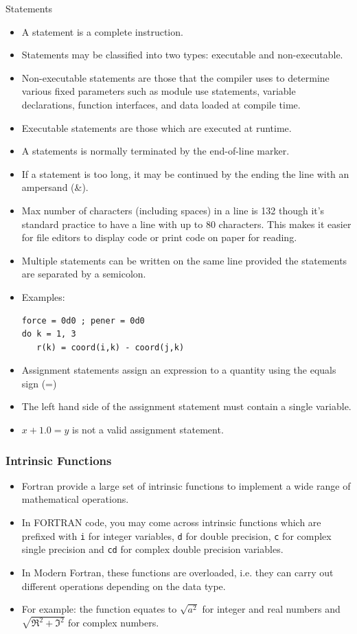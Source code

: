 \documentclass[10pt,t]{beamer}
\begin{document}
\begin{frame}{Statements}
  \begin{itemize}
    \item A statement is a complete instruction.
    \item Statements may be classified into two types: executable and non-executable.
    \item Non-executable statements are those that the compiler uses to determine various fixed parameters such as module use statements, variable declarations, function interfaces, and data loaded at compile time.
    \item Executable statements are those which are executed at runtime.
    \item A statements is normally terminated by the end-of-line marker.
    \item If a statement is too long, it may be continued by the ending the line with an ampersand (\&).
    \item Max number of characters (including spaces) in a line is 132 though it's standard practice to have a line with up to 80 characters. This makes it easier for file editors to display code or print code on paper for reading.
    \item Multiple statements can be written on the same line provided the statements are separated by a semicolon.
    \item Examples:
      \begin{lstlisting}[language={[90]Fortran}]
force = 0d0 ; pener = 0d0
do k = 1, 3
   r(k) = coord(i,k) - coord(j,k)
      \end{lstlisting}
    \item Assignment statements assign an expression to a quantity using the equals sign (=)
    \item The left hand side of the assignment statement must contain a single variable.
    \item $x + 1.0 = y$ is not a valid assignment statement.
  \end{itemize}
\end{frame}

\begin{frame}
  \frametitle{Intrinsic Functions}
  \begin{itemize}
    \item Fortran provide a large set of intrinsic functions to implement a wide range of mathematical operations.
    \item In FORTRAN code, you may come across intrinsic functions which are prefixed with \texttt{i} for integer variables, \texttt{d} for double precision, \texttt{c} for complex single precision and \texttt{cd} for complex double precision variables.
    \item In Modern Fortran, these functions are overloaded, i.e. they can carry out different operations depending on the data type.
    \item For example: the  function equates to $\sqrt{a^2}$ for integer and real numbers and $\sqrt{\Re^2 + \Im^2}$ for complex numbers.
  \end{itemize}
\end{frame}
\end{document}
